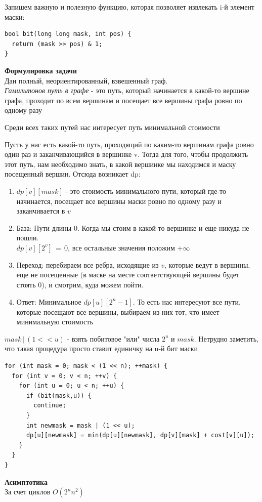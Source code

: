 Запишем важную и полезную функцию, которая позволяет извлекать i-й элемент маски:
\begin{lstlisting}
bool bit(long long mask, int pos) {
  return (mask >> pos) & 1;
}
\end{lstlisting}
\textbf{Формулировка задачи} \\ Дан полный, неориентированный, взвешенный граф.\\
\textit{Гамильтонов путь в графе} - это путь, который начинается в какой-то вершине графа, проходит по всем вершинам и посещает все вершины графа ровно по одному разу

Среди всех таких путей нас интересует путь минимальной стоимости

Пусть у нас есть какой-то путь, проходящий по каким-то вершинам графа ровно один раз и заканчивающийся в вершинке v. Тогда для того, чтобы продолжить этот путь, нам необходимо знать, в какой вершинке мы находимся и маску посещенный вершин. Отсюда возникает dp:
\begin{enumerate}
    \item $dp[v][mask]$ - это стоимость минимального пути, который где-то начинается, посещает все вершины маски ровно по одному разу и заканчивается в $v$
    \item База: Пути длины 0. Когда мы стоим в какой-то вершинке и еще никуда не пошли. \\ $dp[v][2^v]\,=\,0$, все остальные значения положим $+\infty$
    \item Переход: перебираем все ребра, исходящие из $v$, которые ведут в вершины, еще не посещенные (в маске на месте соответствующей вершины будет стоять 0), и смотрим, куда можем пойти.
    \item Ответ: Минимальное $dp[u][2^n - 1]$. То есть нас интересуют все пути, которые посещают все вершины, выбираем из них тот, что имеет минимальную стоимость
\end{enumerate}

 $mask\,|\,(1<<u)$ - взять побитовое "или" числа $2^u$ и $mask$. Нетрудно заметить, что такая процедура просто ставит единичку на u-й бит маски
\begin{lstlisting}
for (int mask = 0; mask < (1 << n); ++mask) {
  for (int v = 0; v < n; ++v) {
    for (int u = 0; u < n; ++u) {
      if (bit(mask,u)) {
        continue;
      }
      int newmask = mask | (1 << u);
      dp[u][newmask] = min(dp[u][newmask], dp[v][mask] + cost[v][u]);
    }
  }
}
\end{lstlisting}

\textbf{Асимптотика} \\
За счет циклов $O(2^n n^2)$

\pagebreak